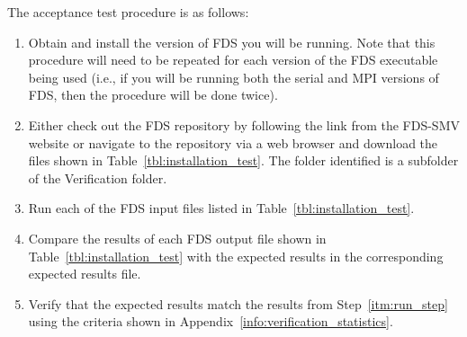 \documentclass[11pt]{book}
\begin{document}
The acceptance test procedure is as follows:

\begin{enumerate}
\item Obtain and install the version of FDS you will be running.  Note that this procedure will need to be repeated for each version of the FDS executable being used (i.e., if you will be running both the serial and MPI versions of FDS, then the procedure will be done twice).
\item Either check out the FDS repository by following the link from the FDS-SMV website or navigate to the repository via a web browser and download the files shown in Table~\ref{tbl:installation_test}.  The folder identified is a subfolder of the Verification folder.
\item Run each of the FDS input files listed in Table~\ref{tbl:installation_test}. \label{itm:run_step}
\item Compare the results of each FDS output file shown in Table~\ref{tbl:installation_test} with the expected results in the corresponding expected results file.
\item Verify that the expected results match the results from Step~\ref{itm:run_step} using the criteria shown in Appendix~\ref{info:verification_statistics}.
\end{enumerate}
\end{document}
